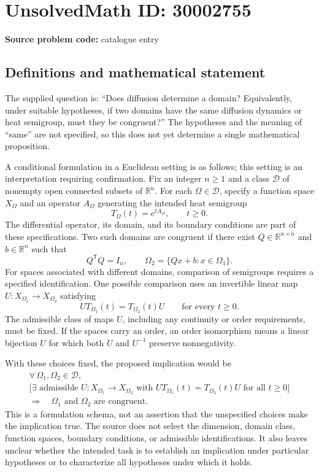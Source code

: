 \documentclass[11pt]{article}
\newcommand{\R}{\mathbb{R}}
\begin{document}
\section*{UnsolvedMath ID: 30002755}
\textbf{Source problem code:} catalogue entry
\subsection{Definitions and mathematical statement}
The supplied question is: ``Does diffusion determine a domain? Equivalently, under suitable hypotheses, if two domains have the same diffusion dynamics or heat semigroup, must they be congruent?'' The hypotheses and the meaning of ``same'' are not specified, so this does not yet determine a single mathematical proposition.

A conditional formulation in a Euclidean setting is as follows; this setting is an interpretation requiring confirmation. Fix an integer \(n\geq 1\) and a class \(\mathcal D\) of nonempty open connected subsets of \(\R^n\). For each \(\Omega\in\mathcal D\), specify a function space \(X_\Omega\) and an operator \(A_\Omega\) generating the intended heat semigroup
\[
T_\Omega(t)=e^{tA_\Omega},\qquad t\geq 0.
\]
The differential operator, its domain, and its boundary conditions are part of these specifications. Two such domains are congruent if there exist \(Q\in\R^{n\times n}\) and \(b\in\R^n\) such that
\[
Q^{\mathsf T}Q=I_n,
\qquad
\Omega_2=\{Qx+b:x\in\Omega_1\}.
\]
For spaces associated with different domains, comparison of semigroups requires a specified identification. One possible comparison uses an invertible linear map \(U:X_{\Omega_1}\to X_{\Omega_2}\) satisfying
\[
U T_{\Omega_1}(t)=T_{\Omega_2}(t)U
\qquad\text{for every }t\geq 0.
\]
The admissible class of maps \(U\), including any continuity or order requirements, must be fixed. If the spaces carry an order, an order isomorphism means a linear bijection \(U\) for which both \(U\) and \(U^{-1}\) preserve nonnegativity.

With these choices fixed, the proposed implication would be
\[
\begin{gathered}
\forall\,\Omega_1,\Omega_2\in\mathcal D,\\
\bigl[\exists\text{ admissible }U:X_{\Omega_1}\to X_{\Omega_2}
\text{ with }UT_{\Omega_1}(t)=T_{\Omega_2}(t)U
\text{ for all }t\geq0\bigr]\\
\Longrightarrow\quad \Omega_1\text{ and }\Omega_2\text{ are congruent}.
\end{gathered}
\]
This is a formulation schema, not an assertion that the unspecified choices make the implication true. The source does not select the dimension, domain class, function spaces, boundary conditions, or admissible identifications. It also leaves unclear whether the intended task is to establish an implication under particular hypotheses or to characterize all hypotheses under which it holds.
\end{document}

